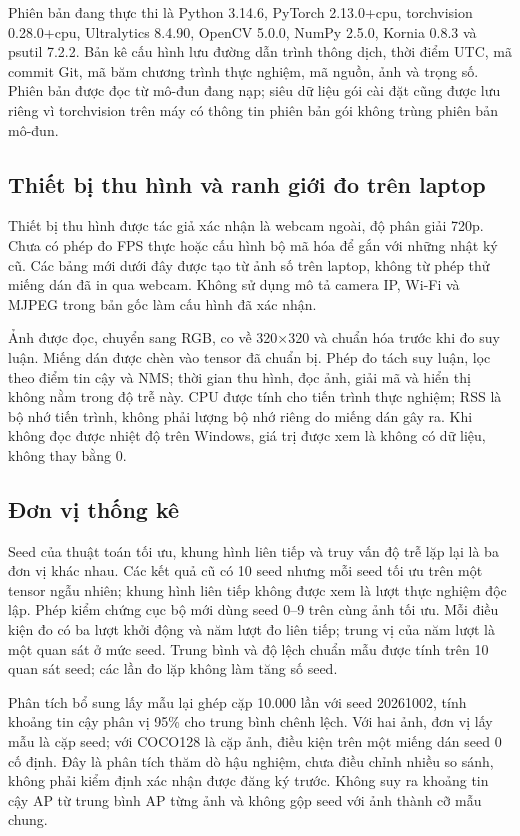 \documentclass[a4paper,fleqn]{cas-dc}
\begin{document}
Phiên bản đang thực thi là Python 3.14.6, PyTorch 2.13.0+cpu, torchvision 0.28.0+cpu, Ultralytics 8.4.90, OpenCV 5.0.0, NumPy 2.5.0, Kornia 0.8.3 và psutil 7.2.2. Bản kê cấu hình lưu đường dẫn trình thông dịch, thời điểm UTC, mã commit Git, mã băm chương trình thực nghiệm, mã nguồn, ảnh và trọng số. Phiên bản được đọc từ mô-đun đang nạp; siêu dữ liệu gói cài đặt cũng được lưu riêng vì torchvision trên máy có thông tin phiên bản gói không trùng phiên bản mô-đun.

\subsection{Thiết bị thu hình và ranh giới đo trên laptop}

Thiết bị thu hình được tác giả xác nhận là webcam ngoài, độ phân giải 720p. Chưa có phép đo FPS thực hoặc cấu hình bộ mã hóa để gắn với những nhật ký cũ. Các bảng mới dưới đây được tạo từ ảnh số trên laptop, không từ phép thử miếng dán đã in qua webcam. Không sử dụng mô tả camera IP, Wi-Fi và MJPEG trong bản gốc làm cấu hình đã xác nhận.

Ảnh được đọc, chuyển sang RGB, co về 320×320 và chuẩn hóa trước khi đo suy luận. Miếng dán được chèn vào tensor đã chuẩn bị. Phép đo tách suy luận, lọc theo điểm tin cậy và NMS; thời gian thu hình, đọc ảnh, giải mã và hiển thị không nằm trong độ trễ này. CPU được tính cho tiến trình thực nghiệm; RSS là bộ nhớ tiến trình, không phải lượng bộ nhớ riêng do miếng dán gây ra. Khi không đọc được nhiệt độ trên Windows, giá trị được xem là không có dữ liệu, không thay bằng 0.

\subsection{Đơn vị thống kê}

Seed của thuật toán tối ưu, khung hình liên tiếp và truy vấn độ trễ lặp lại là ba đơn vị khác nhau. Các kết quả cũ có 10 seed nhưng mỗi seed tối ưu trên một tensor ngẫu nhiên; khung hình liên tiếp không được xem là lượt thực nghiệm độc lập. Phép kiểm chứng cục bộ mới dùng seed 0--9 trên cùng ảnh tối ưu. Mỗi điều kiện đo có ba lượt khởi động và năm lượt đo liên tiếp; trung vị của năm lượt là một quan sát ở mức seed. Trung bình và độ lệch chuẩn mẫu được tính trên 10 quan sát seed; các lần đo lặp không làm tăng số seed.

Phân tích bổ sung lấy mẫu lại ghép cặp 10.000 lần với seed 20261002, tính khoảng tin cậy phân vị 95\% cho trung bình chênh lệch. Với hai ảnh, đơn vị lấy mẫu là cặp seed; với COCO128 là cặp ảnh, điều kiện trên một miếng dán seed 0 cố định. Đây là phân tích thăm dò hậu nghiệm, chưa điều chỉnh nhiều so sánh, không phải kiểm định xác nhận được đăng ký trước. Không suy ra khoảng tin cậy AP từ trung bình AP từng ảnh và không gộp seed với ảnh thành cỡ mẫu chung.
\end{document}
